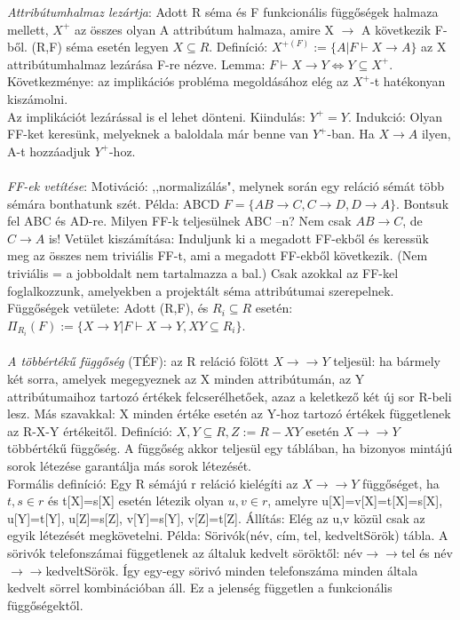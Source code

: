 \documentclass[margin=0px]{article}
\begin{document}
\textit{Attribútumhalmaz lezártja}: Adott R séma és F funkcionális függőségek halmaza mellett, $X^+$ az összes olyan A attribútum halmaza, amire X $\to$ A következik F-ből. (R,F) séma esetén legyen $X \subseteq R$. Definíció: $X^{+(F)}:=\{A | F \vdash X \to A\}$ az X attribútumhalmaz lezárása F-re nézve. Lemma: $F \vdash X \to Y \iff Y \subseteq X^+$. Következménye: az implikációs probléma megoldásához elég az $X^+$-t hatékonyan kiszámolni. \\
Az implikációt lezárással is el lehet dönteni. Kiindulás: $Y^+ = Y$. Indukció: Olyan FF-ket keresünk, melyeknek a baloldala már benne van $Y^+$-ban. Ha $X \to A$ ilyen, A-t hozzáadjuk $Y^+$-hoz. \\\\
\textit{FF-ek vetítése}: Motiváció: ,,normalizálás", melynek során egy reláció sémát több sémára bonthatunk szét. Példa: ABCD $F=\{AB \to C, C \to D, D \to A\}$. Bontsuk fel ABC és AD-re. Milyen FF-k teljesülnek ABC –n? Nem csak $AB \to C$, de $C \to A$ is! Vetület kiszámítása: Induljunk ki a megadott FF-ekből és keressük meg az összes nem triviális FF-t, ami a megadott FF-ekből következik. (Nem triviális = a jobboldalt nem tartalmazza a bal.) Csak azokkal az FF-kel foglalkozzunk, amelyekben a projektált séma attribútumai szerepelnek. Függőségek vetülete: Adott (R,F), és $R_i \subseteq R $ esetén: $\Pi_{R_i}(F):=\{X \to Y | F \vdash X \to Y, XY \subseteq R_i\}$.\\ \\
\textit{A többértékű függőség} (TÉF): az R reláció fölött $X \to\to Y$ teljesül: ha bármely két sorra, amelyek megegyeznek az X minden attribútumán, az Y attribútumaihoz tartozó értékek felcserélhetőek, azaz a keletkező két új sor R-beli lesz. Más szavakkal: X minden értéke esetén az Y-hoz tartozó értékek függetlenek az R-X-Y értékeitől. Definíció: $X,Y \subseteq R, Z:=R-XY$ esetén $X \to\to Y$ többértékű függőség. A függőség akkor teljesül egy táblában, ha bizonyos mintájú sorok létezése garantálja más sorok létezését. \\
Formális definíció: Egy R sémájú r reláció kielégíti az $X \to\to Y$ függőséget, ha $t,s \in r$ és t[X]=s[X] esetén létezik olyan $u,v \in r$, amelyre u[X]=v[X]=t[X]=s[X], u[Y]=t[Y], u[Z]=s[Z],
v[Y]=s[Y], v[Z]=t[Z]. Állítás: Elég az u,v közül csak az egyik létezését megkövetelni.
Példa: Sörivók(név, cím, tel, kedveltSörök) tábla. A sörivók telefonszámai függetlenek az általuk kedvelt söröktől: név$\to\to$tel és név$\to\to$kedveltSörök. Így egy-egy sörivó minden telefonszáma minden általa kedvelt sörrel kombinációban áll. Ez a jelenség független a funkcionális függőségektől. \\
\end{document}
